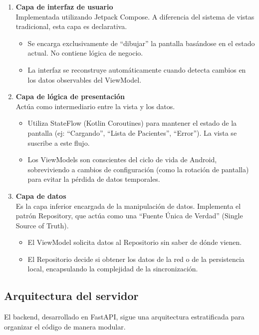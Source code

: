 \begin{enumerate}
    \item \textbf{Capa de interfaz de usuario} \\
    Implementada utilizando Jetpack Compose\cite{jetpack_compose}. A diferencia del sistema de vistas tradicional, esta capa es declarativa.
    \begin{itemize}
        \item Se encarga exclusivamente de ``dibujar'' la pantalla basándose en el estado actual. No contiene lógica de negocio.
        \item La interfaz se reconstruye automáticamente cuando detecta cambios en los datos observables del ViewModel.
    \end{itemize}

    \item \textbf{Capa de lógica de presentación} \\
    Actúa como intermediario entre la vista y los datos.
    \begin{itemize}
        \item Utiliza StateFlow (Kotlin Coroutines) para mantener el estado de la pantalla (ej: ``Cargando'', ``Lista de Pacientes'', ``Error''). La vista se suscribe a este flujo.
        \item Los ViewModels son conscientes del ciclo de vida de Android, sobreviviendo a cambios de configuración (como la rotación de pantalla) para evitar la pérdida de datos temporales.
    \end{itemize}

    \item \textbf{Capa de datos} \\
    Es la capa inferior encargada de la manipulación de datos. Implementa el patrón Repository, que actúa como una ``Fuente Única de Verdad'' (Single Source of Truth).
    \begin{itemize}
        \item El ViewModel solicita datos al Repositorio sin saber de dónde vienen.
        \item El Repositorio decide si obtener los datos de la red o de la persistencia local, encapsulando la complejidad de la sincronización.
    \end{itemize}
\end{enumerate}

\subsection{Arquitectura del servidor}
El backend, desarrollado en FastAPI, sigue una arquitectura estratificada para organizar el código de manera modular.

